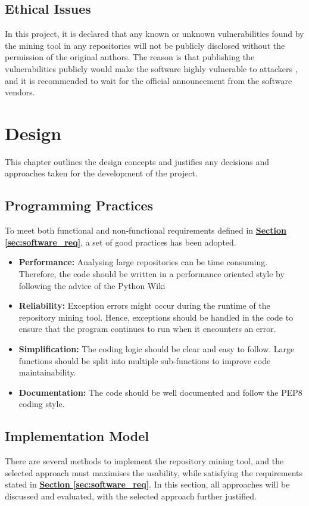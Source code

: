 \documentclass[12pt, a4paper]{report}
\begin{document}
\section{Ethical Issues}
In this project, it is declared that any known or unknown vulnerabilities found by the mining tool
in any repositories will not be publicly disclosed without the permission of the original authors.
The reason is that publishing the vulnerabilities publicly would make the software highly
vulnerable to attackers \cite{arora_2010}, and it is recommended to wait for the official
announcement from the software vendors.

\chapter{Design}
This chapter outlines the design concepts and justifies any decisions and approaches taken for the
development of the project.

\section{Programming Practices}
To meet both functional and non-functional requirements defined in
\hyperref[sec:software_req]{\textbf{Section \ref*{sec:software_req}}}, a set of good practices has
been adopted.
\begin{itemize}
  \item \textbf{Performance:} Analysing large repositories can be time consuming. Therefore, the
  code should be written in a performance oriented style by following the advice of the Python Wiki
  \cite{python_performance_tips}
  \item \textbf{Reliability:} Exception errors might occur during the runtime of the repository
  mining tool. Hence, exceptions should be handled in the code to ensure that the program continues
  to run when it encounters an error.
  \item \textbf{Simplification:} The coding logic should be clear and easy to follow. Large
  functions should be split into multiple sub-functions to improve code maintainability.
  \item \textbf{Documentation:} The code should be well documented and follow the PEP8 \cite{pep8}
  coding style.
\end{itemize}

\section{Implementation Model}
There are several methods to implement the repository mining tool, and the selected approach must
maximises the usability, while satisfying the requirements stated in
\hyperref[sec:software_req]{\textbf{Section \ref*{sec:software_req}}}. In this section, all
approaches will be discussed and evaluated, with the selected approach further justified.
\end{document}
